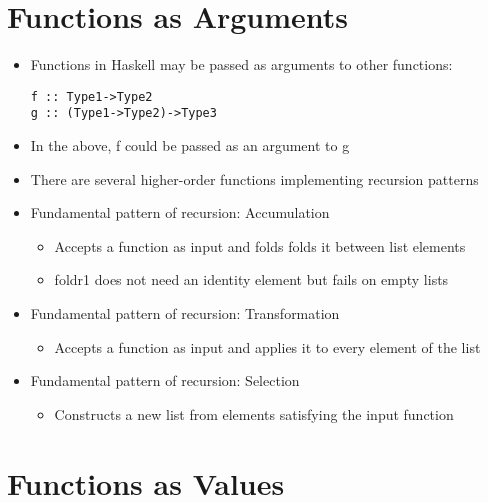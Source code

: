 \documentclass{article}
\begin{document}
\section{Functions as Arguments}

\begin{itemize}
\item Functions in Haskell may be passed as arguments to other functions:
\begin{lstlisting}
f :: Type1->Type2
g :: (Type1->Type2)->Type3
\end{lstlisting}
\item In the above, f could be passed as an argument to g
\item There are several higher-order functions implementing recursion patterns
\item Fundamental pattern of recursion: Accumulation
\begin{itemize}
\begin{lstlisting}
foldr :: (a->b->b)->b->[a]->b
\end{lstlisting}
\item Accepts a function as input and folds folds it between list elements
\item foldr1 does not need an identity element but fails on empty lists
\end{itemize}
\item Fundamental pattern of recursion: Transformation
\begin{itemize}
\begin{lstlisting}
map :: (a->b)->[a]->[b]
\end{lstlisting}
\item Accepts a function as input and applies it to every element of the list
\end{itemize}
\item Fundamental pattern of recursion: Selection
\begin{itemize}
\begin{lstlisting}
filter :: (a->Bool)->[a]->[a]
\end{lstlisting}
\item Constructs a new list from elements satisfying the input function
\end{itemize}
\end{itemize}

\section{Functions as Values}
\end{document}
